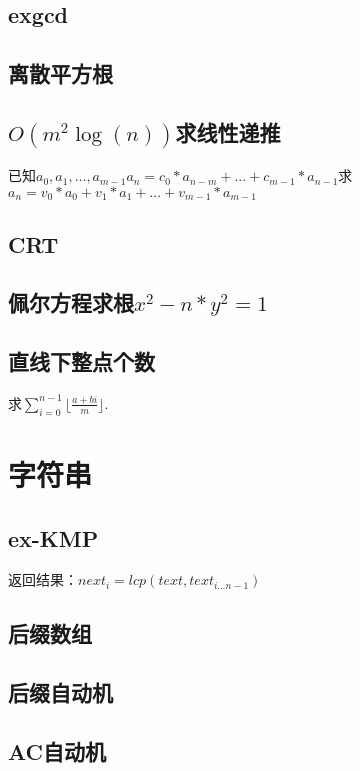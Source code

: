\documentclass[landscape,a4paper]{article}
\begin{document}
\begin{spacing}{0.3}
\begin{multicols}{3}
	\subsection{exgcd}
	
	\subsection{离散平方根}
	
	\subsection{$O(m^2 \log(n))$求线性递推}
	已知$a_0, a_1, ..., a_{m - 1}$$a_n = c_0 * a_{n - m} + ... + c_{m - 1} * a_{n - 1}$求$a_n = v_0 * a_0 + v_1 * a_1 + ... + v_{m - 1} * a_{m - 1}$
	
	\subsection{CRT}
	
	\subsection{佩尔方程求根$x^2-n*y^2=1$}
	
	\subsection{直线下整点个数}
	求$\displaystyle\sum_{i=0}^{n-1} \lfloor\frac{a+bi}{m}\rfloor$.
	
	
	
	\section{字符串}
	\subsection{ex-KMP}
	返回结果：$next_i = lcp(text, text_{i \dots n-1})$
	
	\subsection{后缀数组}
	
	\subsection{后缀自动机}
	
	\subsection{AC自动机}
	

\end{multicols}
\end{spacing}
\end{document}

